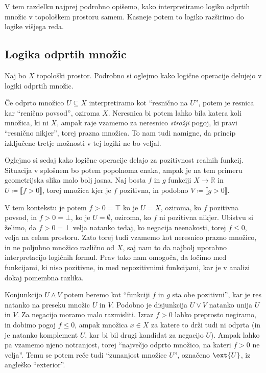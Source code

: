 
V tem razdelku najprej podrobno opišemo, kako interpretiramo logiko odprtih
množic v topološkem prostoru samem. Kasneje potem to logiko razširimo do logike
višjega reda.


\subsection{Logika odprtih množic}

Naj bo \(X\) topološki prostor. Podrobno si oglejmo kako logične operacije
delujejo v logiki odprtih množic.

Če odprto množico \(U ⊆ X\) interpretiramo kot ``resnično na \(U\)'', potem je
resnica kar ``renično povsod'', oziroma \(X\). Neresnica bi potem lahko bila
katera koli množica, ki ni \(X\), ampak raje vzamemo za neresnico \emph{strožji}
pogoj, ki pravi ``resnično nikjer'', torej prazna množica. To nam tudi namigne,
da princip izključene tretje možnosti v tej logiki ne bo veljal.

Oglejmo si sedaj kako logične operacije delajo za pozitivnost realnih funkcij.
Situacija v splošnem bo potem popolnoma enaka, ampak je na tem primeru
geometrijska slika malo bolj jasna. Naj bosta \(f\) in \(g\) funkciji \(X → ℝ\)
in \(U ≔ ⟦f > 0⟧\), torej množica kjer je \(f\) pozitivna, in podobno \(V ≔ ⟦g > 0⟧\).

V tem kontekstu je potem \(f > 0 = ⊤\) ko je \(U = X\), oziroma, ko \(f\)
pozitivna povsod, in \(f > 0 = ⊥\), ko je \(U = ∅\), oziroma, ko \(f\) ni
pozitivna nikjer. Ubistvu si želimo, da \(f > 0 = ⊥\) velja natanko tedaj, ko
negacija neenakosti, torej \(f ≤ 0\), velja na celem prostoru. Zato torej tudi
vzamemo kot neresnico prazno množico, in ne poljubno množico različno od \(X\),
saj nam to da najbolj uporabno interpretacijo logičnih formul. Prav tako nam
omogoča, da ločimo med funkcijami, ki niso pozitivne, in med nepozitivnimi
funkcijami, kar je v analizi dokaj pomembna razlika.

Konjunkcijo \(U ∧ V\) potem beremo kot ``funkciji \(f\) in \(g\) sta obe
pozitivni'', kar je res natanko na preseku množic \(U\) in \(V\). Podobno je
disjunkcija \(U ∨ V\) natanko unija \(U\) in \(V\).
Za negacijo moramo malo razmisliti. Izraz \(f > 0\) lahko preprosto negiramo, in
dobimo pogoj \(f ≤ 0\), ampak množica \(x ∈ X\) za katere to drži tudi ni odprta
(in je natanko komplement \(U\), kar bi bil drugi kandidat za negacijo \(U\)).
Ampak lahko pa vzamemo njeno notranjost, torej ``največjo odprto množico, na
kateri \(f > 0\) ne velja''. Temu se potem reče tudi ``zunanjost množice
\(U\)'', označeno \(\ext{U}\), iz angleško ``\foreignlanguage{english}{exterior}''.

